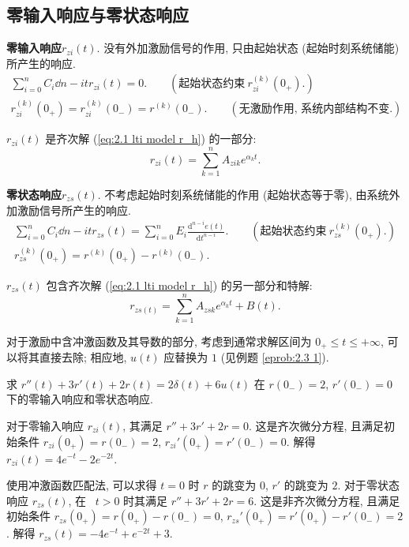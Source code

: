 \subsection{零输入响应与零状态响应}

\textbf{零输入响应}\quad $r_{zi}(t)$. 没有外加激励信号的作用, 只由起始状态 (起始时刻系统储能) 所产生的响应.
\begin{gather}
    \sum_{i=0}^{n}C_i\dd{n-i}{t}r_{zi}(t)=0.\qquad (\textrm{起始状态约束}\ r^{(k)}_{zi}(0_{+}).) \\
    r^{(k)}_{zi}(0_{+})=r^{(k)}_{zi}(0_{-})=r^{(k)}(0_{-}).\qquad (\textrm{无激励作用, 系统内部结构不变.}) \label{eq:2.3 r_zi 0+}
\end{gather}

$r_{zi}(t)$ 是齐次解 (\ref{eq:2.1 lti model r_h}) 的一部分:
\begin{equation}
    r_{zi}(t)=\sum_{k=1}^{n}A_{zik}e^{\alpha_k t}.
\end{equation}

\textbf{零状态响应}\quad $r_{zs}(t)$. 不考虑起始时刻系统储能的作用 (起始状态等于零), 由系统外加激励信号所产生的响应.
\begin{gather}
    \sum_{i=0}^{n}C_i\dd{n-i}{t}r_{zs}(t)=\sum_{i=0}^{n}E_i\frac{\mathrm{d}^{n-i}e(t)}{\mathrm{d}t^{n-i}}. \qquad (\textrm{起始状态约束}\ r^{(k)}_{zs}(0_{+}).) \\
    r^{(k)}_{zs}(0_{+})=r^{(k)}(0_{+})-r^{(k)}(0_{-}). \label{eq:2.3 r_zs 0+}
\end{gather}

$r_{zs}(t)$ 包含齐次解 (\ref{eq:2.1 lti model r_h}) 的另一部分和特解:
\begin{equation}
    r_{zs(t)}=\sum_{k=1}^{n}A_{zsk}e^{\alpha_k t}+B(t).
\end{equation}

对于激励中含冲激函数及其导数的部分, 考虑到通常求解区间为 $0_+\leq t\leq +\infty$, 可以将其直接去除; 相应地, $u(t)$ 应替换为 $1$ (见例题 \ref{eprob:2.3 1}).

\begin{exampleprob} \label{eprob:2.3 1}
    求 $r''(t)+3r'(t)+2r(t)=2\delta(t)+6u(t)$ 在 $r(0_-)=2$, $r'(0_-)=0$ 下的零输入响应和零状态响应.

    \begin{solution}
        对于零输入响应 $r_{zi}(t)$, 其满足 $r''+3r'+2r=0$. 这是齐次微分方程, 且满足初始条件 $r_{zi}(0_+)=r(0_-)=2$, $r_{zi}'(0_+)=r'(0_-)=0$. 解得 $r_{zi}(t)=4e^{-t}-2e^{-2t}$.

        使用冲激函数匹配法, 可以求得 $t=0$ 时 $r$ 的跳变为 $0$, $r'$ 的跳变为 $2$. 对于零状态响应 $r_{zs}(t)$, 在\ {\color{red} $t>0$} 时其满足 $r''+3r'+2r=6$. 这是非齐次微分方程, 且满足初始条件 $r_{zs}(0_+)=r(0_+)-r(0_-)=0$, $r_{zs}'(0_+)=r'(0_+)-r'(0_-)=2$. 解得 $r_{zs}(t)=-4e^{-t}+e^{-2t}+3$.
    \end{solution}
\end{exampleprob}

